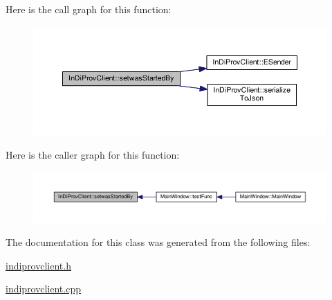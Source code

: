 Here is the call graph for this function\-:
\nopagebreak
\begin{figure}[H]
\begin{center}
\leavevmode
\includegraphics[width=350pt]{class_in_di_prov_client_a05a450e338417ff0966bba635834f64a_cgraph}
\end{center}
\end{figure}




Here is the caller graph for this function\-:
\nopagebreak
\begin{figure}[H]
\begin{center}
\leavevmode
\includegraphics[width=350pt]{class_in_di_prov_client_a05a450e338417ff0966bba635834f64a_icgraph}
\end{center}
\end{figure}




The documentation for this class was generated from the following files\-:\begin{DoxyCompactItemize}
\item 
\hyperlink{indiprovclient_8h}{indiprovclient.\-h}\item 
\hyperlink{indiprovclient_8cpp}{indiprovclient.\-cpp}\end{DoxyCompactItemize}
